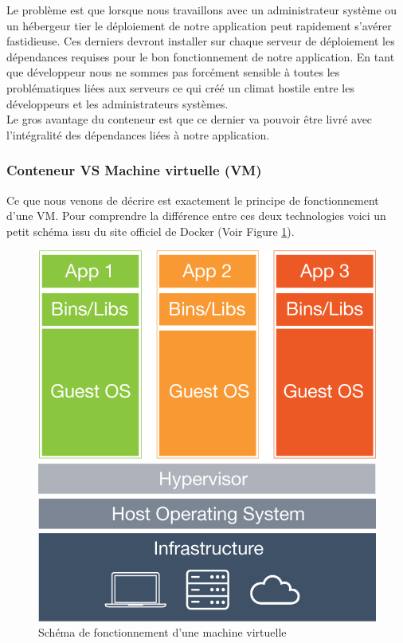       Le problème est que lorsque nous travaillons avec un administrateur système ou un hébergeur tier le déploiement de notre application peut rapidement s’avérer fastidieuse. Ces derniers devront installer sur chaque serveur de déploiement les dépendances requises pour le bon fonctionnement de notre application. En tant que développeur nous ne sommes pas forcément sensible à toutes les problématiques liées aux serveurs ce qui créé un climat hostile entre les développeurs et les administrateurs systèmes.\\

      Le gros avantage du conteneur est que ce dernier va pouvoir être livré avec l’intégralité des dépendances liées à notre application.

      \subsubsection{Conteneur VS Machine virtuelle (VM)}
      Ce que nous venons de décrire est exactement le principe de fonctionnement d’une VM. Pour comprendre la différence entre ces deux technologies voici un petit schéma issu du site officiel de Docker (Voir Figure \ref{Virtual Machine}).\\

      \begin{figure}
        \begin{center}
          \includegraphics[scale=0.2]{images/virtualMachine.png}
        \end{center}
        \caption{Schéma de fonctionnement d'une machine virtuelle}
        \label{Virtual Machine}
      \end{figure}

